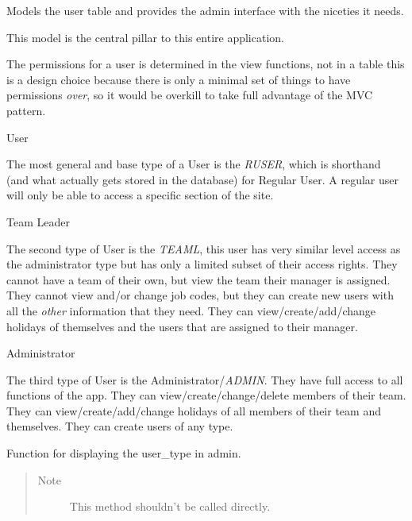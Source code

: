 \documentclass[letterpaper,10pt,english]{sphinxmanual}
\begin{document}
\begin{fulllineitems}
\label{timetracker:timetracker.tracker.models.Tbluser}
Models the user table and provides the admin interface with the
niceties it needs.

This model is the central pillar to this entire application.

The permissions for a user is determined in the view functions, not in a
table this is a design choice because there is only a minimal set of
things to have permissions \emph{over}, so it would be overkill to take full
advantage of the MVC pattern.

User

The most general and base type of a User is the \emph{RUSER}, which is
shorthand (and what actually gets stored in the database) for Regular
User. A regular user will only be able to access a specific section of the
site.

Team Leader

The second type of User is the \emph{TEAML}, this user has very similar level
access as the administrator type but has only a limited subset of their
access rights. They cannot have a team of their own, but view the team
their manager is assigned. They cannot view and/or change job codes, but
they can create new users with all the \emph{other} information that they
need. They can view/create/add/change holidays of themselves and the users
that are assigned to their manager.

Administrator

The third type of User is the Administrator/\emph{ADMIN}. They have full access to all
functions of the app. They can view/create/change/delete members of their
team. They can view/create/add/change holidays of all members of their
team and themselves. They can create users of any type.

\begin{fulllineitems}
\label{timetracker:timetracker.tracker.models.Tbluser.display_user_type}
Function for displaying the user\_type in admin.
\begin{quote}\begin{description}
\item[{Note }] \leavevmode
This method shouldn't be called directly.


\end{description}
\end{quote}
\end{fulllineitems}
\end{fulllineitems}
\end{document}
